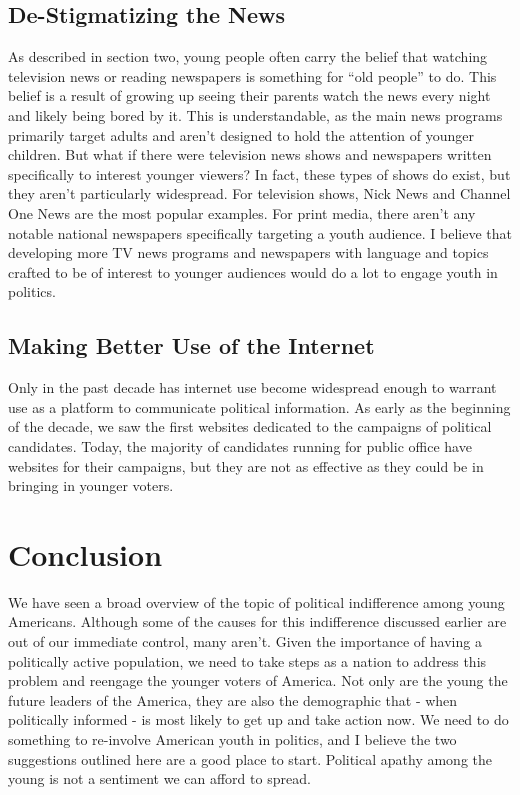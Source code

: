 \documentclass[12pt,letterpaper]{article}
\begin{document}
\subsection{De-Stigmatizing the News}
As described in section two, young people often carry the belief that
watching television news or reading newspapers is something for ``old
people'' to do.  This belief is a result of growing up seeing their
parents watch the news every night and likely being bored by it.
This is understandable, as the main news programs primarily target
adults and aren't designed to hold the attention of younger children.
But what if there were television news shows and newspapers written
specifically to interest younger viewers?  In fact, these types of
shows do exist, but they aren't particularly widespread. For
television shows, Nick News and Channel One News are the most popular
examples.  For print media, there aren't any notable national
newspapers specifically targeting a youth audience. I believe that
developing more TV news programs and newspapers with language and
topics crafted to be of interest to younger audiences would do a lot
to engage youth in politics.  

\subsection{Making Better Use of the Internet}
Only in the past decade has internet use become widespread enough to
warrant use as a platform to communicate political information.  As
early as the beginning of the decade, we saw the first websites
dedicated to the campaigns of political candidates.  Today, the
majority of candidates running for public office have websites for
their campaigns, but they are not as effective as they could be in
bringing in younger voters.  


\section{Conclusion} %
\label{sec:Conclusion}
We have seen a broad overview of the topic of political indifference
among young Americans. Although some of the causes for this
indifference discussed earlier are out of our immediate control, many
aren't. Given the importance of having a politically active
population, we need to take steps as a nation to address this problem
and reengage the younger voters of America.  Not only are the young
the future leaders of the America, they are also the demographic that
- when politically informed - is most likely to get up and take action
now. We need to do something to re-involve American youth in politics,
and I believe the two suggestions outlined here are a good place to
start.  Political apathy among the young is not a sentiment we can
afford to spread.

\end{document}

